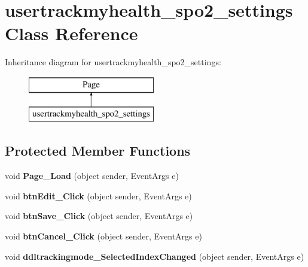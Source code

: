 \hypertarget{classusertrackmyhealth__spo2__settings}{\section{usertrackmyhealth\-\_\-spo2\-\_\-settings Class Reference}
\label{classusertrackmyhealth__spo2__settings}
}
Inheritance diagram for usertrackmyhealth\-\_\-spo2\-\_\-settings\-:\begin{figure}[H]
\begin{center}
\leavevmode
\includegraphics[height=2.000000cm]{classusertrackmyhealth__spo2__settings}
\end{center}
\end{figure}
\subsection*{Protected Member Functions}
\begin{DoxyCompactItemize}
\item 
\hypertarget{classusertrackmyhealth__spo2__settings_a0e1d041dd5f5965f82f1bcc679793dbf}{void {\bfseries Page\-\_\-\-Load} (object sender, Event\-Args e)}\label{classusertrackmyhealth__spo2__settings_a0e1d041dd5f5965f82f1bcc679793dbf}

\item 
\hypertarget{classusertrackmyhealth__spo2__settings_a642dd35119c8a03fc511566543fa373a}{void {\bfseries btn\-Edit\-\_\-\-Click} (object sender, Event\-Args e)}\label{classusertrackmyhealth__spo2__settings_a642dd35119c8a03fc511566543fa373a}

\item 
\hypertarget{classusertrackmyhealth__spo2__settings_a43b1c4314408b9304b402bdba125df8a}{void {\bfseries btn\-Save\-\_\-\-Click} (object sender, Event\-Args e)}\label{classusertrackmyhealth__spo2__settings_a43b1c4314408b9304b402bdba125df8a}

\item 
\hypertarget{classusertrackmyhealth__spo2__settings_a677c3f824224e6388dc6e63946898ddc}{void {\bfseries btn\-Cancel\-\_\-\-Click} (object sender, Event\-Args e)}\label{classusertrackmyhealth__spo2__settings_a677c3f824224e6388dc6e63946898ddc}

\item 
\hypertarget{classusertrackmyhealth__spo2__settings_a0529e6f6f58122b8ea56f71752eb3f10}{void {\bfseries ddltrackingmode\-\_\-\-Selected\-Index\-Changed} (object sender, Event\-Args e)}\label{classusertrackmyhealth__spo2__settings_a0529e6f6f58122b8ea56f71752eb3f10}

\end{DoxyCompactItemize}


